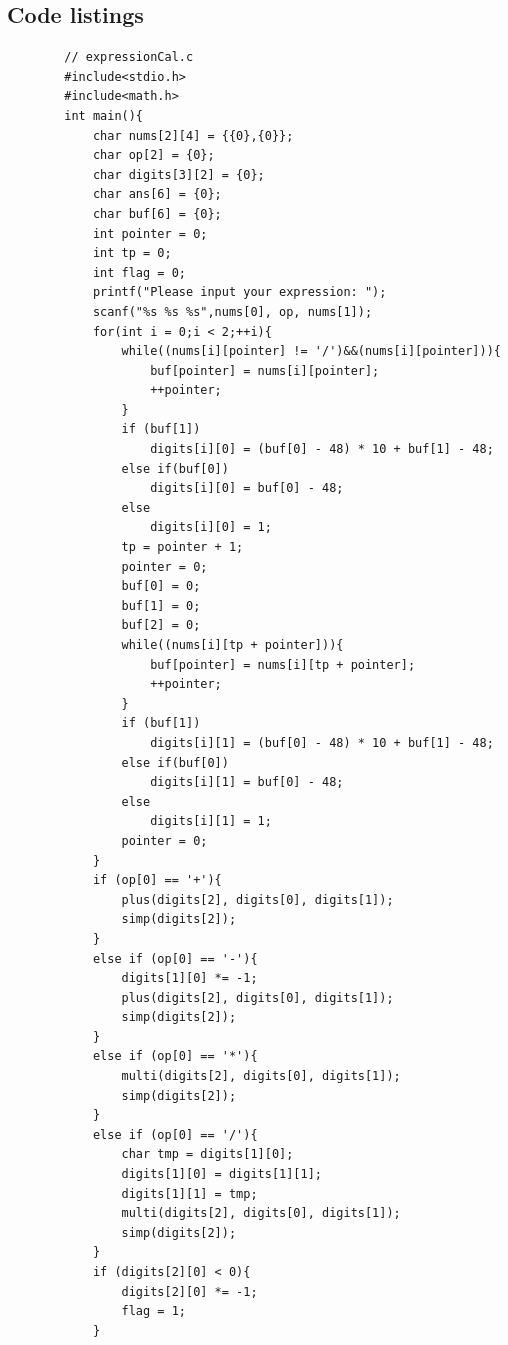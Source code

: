 \documentclass{article}
\begin{document}
\begin{appendices}
    \section{Code listings}
    \begin{lstlisting}
        // expressionCal.c
        #include<stdio.h>
        #include<math.h>
        int main(){
            char nums[2][4] = {{0},{0}};
            char op[2] = {0};
            char digits[3][2] = {0};
            char ans[6] = {0};
            char buf[6] = {0};
            int pointer = 0;
            int tp = 0;
            int flag = 0;
            printf("Please input your expression: ");
            scanf("%s %s %s",nums[0], op, nums[1]);
            for(int i = 0;i < 2;++i){
                while((nums[i][pointer] != '/')&&(nums[i][pointer])){
                    buf[pointer] = nums[i][pointer];
                    ++pointer;
                }
                if (buf[1])
                    digits[i][0] = (buf[0] - 48) * 10 + buf[1] - 48;
                else if(buf[0])
                    digits[i][0] = buf[0] - 48;
                else
                    digits[i][0] = 1;
                tp = pointer + 1;
                pointer = 0;
                buf[0] = 0;
                buf[1] = 0;
                buf[2] = 0;
                while((nums[i][tp + pointer])){
                    buf[pointer] = nums[i][tp + pointer];
                    ++pointer;
                }
                if (buf[1])
                    digits[i][1] = (buf[0] - 48) * 10 + buf[1] - 48;
                else if(buf[0])
                    digits[i][1] = buf[0] - 48;
                else
                    digits[i][1] = 1;
                pointer = 0;
            }
            if (op[0] == '+'){
                plus(digits[2], digits[0], digits[1]);
                simp(digits[2]);
            }
            else if (op[0] == '-'){
                digits[1][0] *= -1;
                plus(digits[2], digits[0], digits[1]);
                simp(digits[2]);
            }
            else if (op[0] == '*'){
                multi(digits[2], digits[0], digits[1]);
                simp(digits[2]);
            }
            else if (op[0] == '/'){
                char tmp = digits[1][0];
                digits[1][0] = digits[1][1];
                digits[1][1] = tmp;
                multi(digits[2], digits[0], digits[1]);
                simp(digits[2]);
            }
            if (digits[2][0] < 0){
                digits[2][0] *= -1;
                flag = 1;
            }

\end{lstlisting}
\end{appendices}
\end{document}
